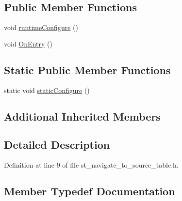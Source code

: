 \subsection*{Public Member Functions}
\begin{DoxyCompactItemize}
\item 
void \hyperlink{structsm__moveit__4_1_1StNavigateToSourceTable_a532b64eb7ea6938d22c712e29ecf0ac9}{runtime\+Configure} ()
\item 
void \hyperlink{structsm__moveit__4_1_1StNavigateToSourceTable_aa90111c5a22ed67dfe20024a7b135837}{On\+Entry} ()
\end{DoxyCompactItemize}
\subsection*{Static Public Member Functions}
\begin{DoxyCompactItemize}
\item 
static void \hyperlink{structsm__moveit__4_1_1StNavigateToSourceTable_a10d9b17cf7d5450760c13552eb9de0b5}{static\+Configure} ()
\end{DoxyCompactItemize}
\subsection*{Additional Inherited Members}


\subsection{Detailed Description}


Definition at line 9 of file st\+\_\+navigate\+\_\+to\+\_\+source\+\_\+table.\+h.



\subsection{Member Typedef Documentation}
\mbox{\label{structsm__moveit__4_1_1StNavigateToSourceTable_ae1b19f752700392a40f225b02d677571}} 
